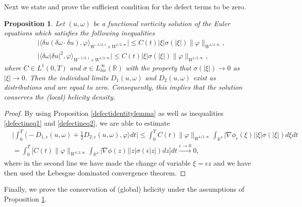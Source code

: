 \documentclass[12pt,a4paper]{article}
\newtheorem{proposition}[theorem]{Proposition}
\theoremstyle{definition}
\theoremstyle{remark}
\numberwithin{equation}{section}
\begin{document}
Next we state and prove the sufficient condition for the defect terms to be zero.
\begin{proposition} \label{sufficientconditioneuler}
Let $(u, \omega)$ be a functional vorticity solution of the Euler equations which satisfies the following inequalities
\begin{align}
&\bigg\lvert \langle \delta u (\delta \omega \cdot \delta u), \varphi \rangle_{W^{-1/2,1} \times W^{1/2,\infty}} \bigg\rvert \leq C(t) \lvert \xi \rvert \sigma (\lvert \xi \rvert) \lVert \varphi \rVert_{W^{1/2,\infty}}, \label{defectineq1} \\
&\bigg\lvert \langle \delta \omega \lvert \delta u \rvert^2 , \varphi \rangle_{W^{-1/2,1} \times W^{1/2,\infty}} \bigg\rvert \leq C(t) \lvert \xi \rvert \sigma (\lvert \xi \rvert) \lVert \varphi \rVert_{W^{1/2,\infty}}, \label{defectineq2}
\end{align}
where $C \in L^1 (0,T)$ and $\sigma \in L^\infty_{loc} (\mathbb{R})$ with the property that $\sigma (\lvert \xi \rvert)\rightarrow 0$ as $\lvert \xi \rvert \rightarrow 0$. Then the individual limits $D_{1} (u, \omega)$ and $D_2 (u, \omega)$ exist as distributions and are equal to zero. Consequently, this implies that the solution conserves the (local) helicity density. 
\end{proposition}
\begin{proof}

By using Proposition \ref{defectidentitylemma} as well as inequalities \eqref{defectineq1} and \eqref{defectineq2}, we are able to estimate
\begin{align*}
&\bigg\lvert \int_0^T \bigg\langle - D_{1,\epsilon} (u, \omega) + \frac{1}{2} D_{2,\epsilon} (u, \omega) , \varphi \bigg\rangle dt \bigg\rvert \leq \int_0^T C(t) \lVert \varphi \rVert_{W^{1/2,\infty}}  \int_{\mathbb{R}^3} \lvert \nabla \phi_\epsilon (\xi) \rvert \lvert \xi \rvert \sigma (\lvert \xi \rvert) d \xi dt \\
&= \int_0^T \bigg[ C(t) \lVert \varphi \rVert_{W^{1/2,\infty}}  \int_{\mathbb{R}^3} \lvert \nabla \phi (z) \rvert \lvert z \rvert \sigma (\epsilon \lvert z \rvert) d z \bigg] dt \xrightarrow[]{\epsilon \rightarrow 0} 0,
\end{align*}
where in the second line we have made the change of variable $\xi = \epsilon z$ and we have then used the Lebesgue dominated convergence theorem. 
\end{proof}
Finally, we prove the conservation of (global) helicity under the assumptions of Proposition \ref{sufficientconditioneuler}. 
\end{document}
